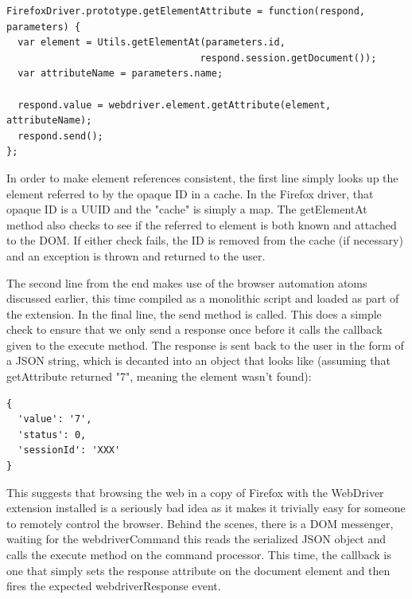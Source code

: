 \documentclass[12pt]{report}
\begin{document}
\begin{verbatim}
FirefoxDriver.prototype.getElementAttribute = function(respond, parameters) {
  var element = Utils.getElementAt(parameters.id,
                                  respond.session.getDocument());
  var attributeName = parameters.name;

  respond.value = webdriver.element.getAttribute(element, attributeName);
  respond.send();
};

\end{verbatim}
In order to make element references consistent, the first line simply looks up the element referred to by the opaque ID in a cache. In the Firefox driver, that opaque ID is a UUID and the "cache" is simply a map. The getElementAt method also checks to see if the referred to element is both known and attached to the DOM. If either check fails, the ID is removed from the cache (if necessary) and an exception is thrown and returned to the user.

The second line from the end makes use of the browser automation atoms discussed earlier, this time compiled as a monolithic script and loaded as part of the extension.
In the final line, the send method is called. This does a simple check to ensure that we only send a response once before it calls the callback given to the execute method. The response is sent back to the user in the form of a JSON string, which is decanted into an object that looks like (assuming that getAttribute returned "7", meaning the element wasn't found):
\begin{verbatim}
{
  'value': '7',
  'status': 0,
  'sessionId': 'XXX'
}
\end{verbatim}
This suggests that browsing the web in a copy of Firefox with the WebDriver extension installed is a seriously bad idea as it makes it trivially easy for someone to remotely control the browser.
Behind the scenes, there is a DOM messenger, waiting for the webdriverCommand this reads the serialized JSON object and calls the execute method on the command processor. This time, the callback is one that simply sets the response attribute on the document element and then fires the expected webdriverResponse event.
\end{document}

